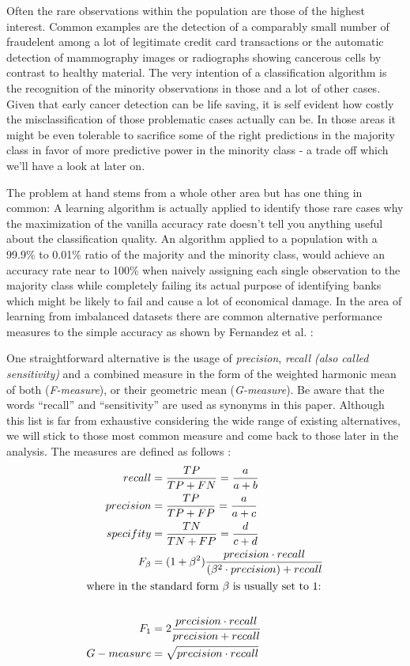 \documentclass[12pt,a4paper]{article}
\begin{document}
Often the rare observations within the population are those of the highest interest. Common examples are the detection of a comparably small number of fraudelent among a lot of legitimate credit card transactions or the automatic detection of mammography images or radiographs showing cancerous cells by contrast to healthy material. The very intention of a classification algorithm is the recognition of the minority observations in those and a lot of other cases. Given that early cancer detection can be life saving, it is self evident how costly the misclassification of those problematic cases actually can be. In those areas it might be even tolerable to sacrifice some of the right predictions in the majority class in favor of more predictive power in the minority class - a trade off which we'll have a look at later on. \par
The problem at hand stems from a whole other area but has one thing in common: A learning algorithm is actually applied to identify those rare cases why the maximization of the vanilla accuracy rate doesn't tell you anything useful about the classification quality. An algorithm applied to a population with a 99.9\% to 0.01\% ratio of the majority and the minority class, would achieve an accuracy rate near to 100\% when naively assigning each single observation to the majority class while completely failing its actual purpose of identifying banks which might be likely to fail and cause a lot of economical damage. In the area of learning from imbalanced datasets there are common alternative performance measures to the simple accuracy as shown by Fernandez et al. \cite{fernandez2018learning}:\par
One straightforward alternative is the usage of \textit{precision}, \textit{recall (also called sensitivity)} and a combined measure in the form of the weighted harmonic mean of both (\textit{F-measure}), or their geometric mean (\textit{G-measure}). Be aware that the words \enquote{recall} and \enquote{sensitivity} are used as synonyms in this paper. Although this list is far from exhaustive considering the wide range of existing alternatives, we will stick to those most common measure and come back to those later in the analysis. The measures are defined as follows \cite{fernandez2018learning}:
\begin{align*}
recall&=\frac{TP}{TP + FN}=\frac{a}{a+b}\\
precision&=\frac{TP}{TP + FP}=\frac{a}{a+c}\\
specifity&=\frac{TN}{TN+FP}=\frac{d}{c+d}\\
    F_\beta &= (1+\beta^2)\frac{precision\cdot recall}{(\beta^2 \cdot precision)+recall}\\
    \intertext{where in the standard form $\beta$ is usually set to 1:}\\
    F_1&=2\frac{precision\cdot recall}{precision + recall}\\
    G-measure&=\sqrt{precision\cdot recall}
\end{align*}
\end{document}
